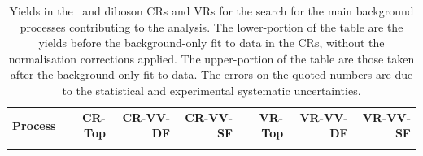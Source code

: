 %
%

\begin{table}[!htb]
\begin{center}
\setlength{\tabcolsep}{0.0pc}
{\scriptsize
\caption{
Yields in the \ttbar~and diboson CRs and VRs for the \bWN search for the main background processes
contributing to the analysis.
The lower-portion of the table are the yields before the background-only fit to data
in the CRs, without the normalisation corrections applied.
The upper-portion of the table are those taken after the background-only fit to data.
The errors on the quoted numbers are due to the statistical and experimental systematic uncertainties.
}
\label{tab:bkgonly_CRVR}
\begin{tabular*}{\textwidth}{@{\extracolsep{\fill}}lrrrrrr}
\noalign{\smallskip}\hline\noalign{\smallskip}
\noalign{\smallskip}\hline\noalign{\smallskip}
\textbf{Process}           & \textbf{CR-Top}            & \textbf{CR-VV-DF}            & \textbf{CR-VV-SF}            & \textbf{VR-Top}           & \textbf{VR-VV-DF}            & \textbf{VR-VV-SF}              \\[-0.05cm]
\noalign{\smallskip}\hline\noalign{\smallskip}



\end{tabular*}}
\end{center}
\end{table}

